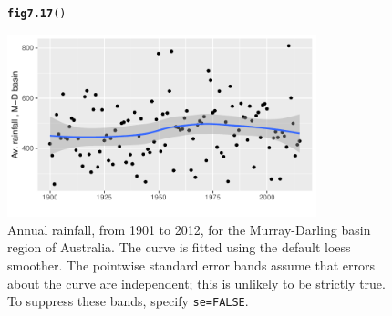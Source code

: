 \documentclass[12pt, a4paper,  BCOR=8.25mm, DIV=15]{scrartcl}\usepackage[]{graphicx}\usepackage[]{color}
\makeatletter
\newcommand{\hlstd}[1]{\textcolor[rgb]{0.345,0.345,0.345}{#1}}%
\newcommand{\hlkwd}[1]{\textcolor[rgb]{0.737,0.353,0.396}{\textbf{#1}}}%
\newenvironment{kframe}{%
 \def\at@end@of@kframe{}%
 \ifinner\ifhmode%
  \def\at@end@of@kframe{\end{minipage}}%
  \begin{minipage}{\columnwidth}%
 \fi\fi%
 \def\FrameCommand##1{\hskip\@totalleftmargin \hskip-\fboxsep
 \colorbox{shadecolor}{##1}\hskip-\fboxsep
     \hskip-\linewidth \hskip-\@totalleftmargin \hskip\columnwidth}%
 \MakeFramed {\advance\hsize-\width
   \@totalleftmargin\z@ \linewidth\hsize
   \@setminipage}}%
 {\par\unskip\endMakeFramed%
 \at@end@of@kframe}
\newenvironment{knitrout}{}{} %
\makeatother
\begin{document}
\addtocounter{figure}{1}

\begin{figure}[ht]
\begin{knitrout}
\color{fgcolor}\begin{kframe}
\begin{alltt}
\hlkwd{fig7.17}\hlstd{()}
\end{alltt}


{\ttfamily\noindent\itshape{}}\end{kframe}

{\centering \includegraphics[width=0.8\textwidth]{figure/gph-fig7_17e-1} 

}



\end{knitrout}
\caption{Annual rainfall, from 1901 to 2012, for the Murray-Darling
  basin region of Australia.  The curve is fitted using the default
  loess smoother. The pointwise standard error bands assume that
  errors about the curve are independent; this is unlikely to be
  strictly true. To suppress these bands, specify
  \texttt{se=FALSE}.\label{fig:ggrain}}
\end{figure}
\end{document}
